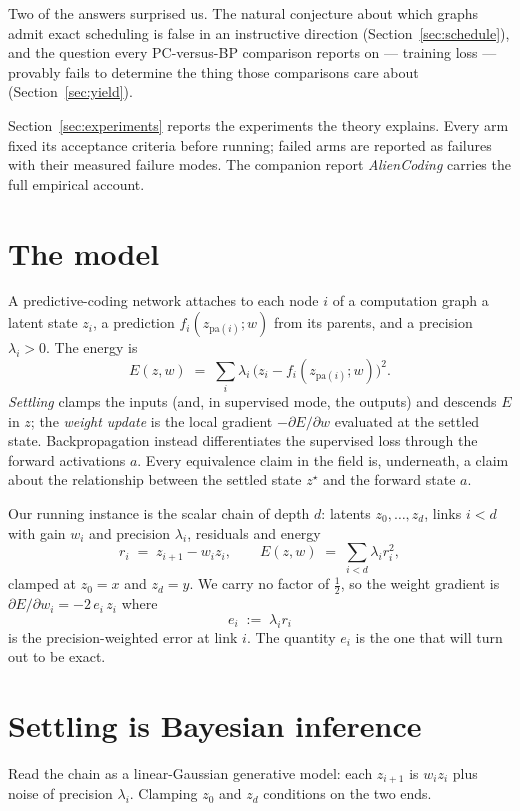 \documentclass[11pt]{article}
\begin{document}
Two of the answers surprised us. The natural conjecture about which graphs admit exact
scheduling is false in an instructive direction (Section~\ref{sec:schedule}), and the
question every PC-versus-BP comparison reports on --- training loss --- provably fails
to determine the thing those comparisons care about (Section~\ref{sec:yield}).

Section~\ref{sec:experiments} reports the experiments the theory explains. Every arm
fixed its acceptance criteria before running; failed arms are reported as failures with
their measured failure modes. The companion report \emph{AlienCoding} carries the full
empirical account.

\section{The model}

A predictive-coding network attaches to each node $i$ of a computation graph a latent
state $z_i$, a prediction $f_i(z_{\mathrm{pa}(i)};w)$ from its parents, and a precision
$\lambda_i > 0$. The energy is
\[
E(z,w) \;=\; \sum_i \lambda_i\,\bigl(z_i - f_i(z_{\mathrm{pa}(i)};w)\bigr)^2 .
\]
\emph{Settling} clamps the inputs (and, in supervised mode, the outputs) and descends
$E$ in $z$; the \emph{weight update} is the local gradient $-\partial E/\partial w$
evaluated at the settled state. Backpropagation instead differentiates the supervised
loss through the forward activations $a$. Every equivalence claim in the field is,
underneath, a claim about the relationship between the settled state $z^\star$ and the
forward state $a$.

Our running instance is the scalar chain of depth $d$: latents $z_0,\dots,z_d$, links
$i < d$ with gain $w_i$ and precision $\lambda_i$, residuals and energy
\[
r_i \;=\; z_{i+1} - w_i z_i, \qquad E(z,w) \;=\; \sum_{i<d} \lambda_i r_i^2 ,
\]
clamped at $z_0 = x$ and $z_d = y$. We carry no factor of $\tfrac12$, so the weight
gradient is $\partial E/\partial w_i = -2\,e_i\,z_i$ where
\[
e_i \;:=\; \lambda_i r_i
\]
is the precision-weighted error at link $i$. The quantity $e_i$ is the one that will
turn out to be exact.

\section{Settling is Bayesian inference}

Read the chain as a linear-Gaussian generative model: each $z_{i+1}$ is $w_i z_i$ plus
noise of precision $\lambda_i$. Clamping $z_0$ and $z_d$ conditions on the two ends.
\end{document}
